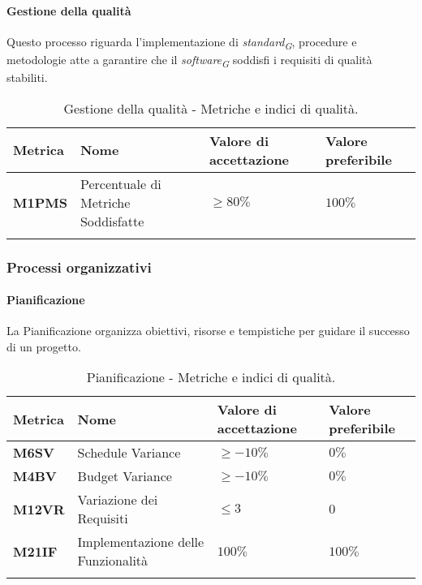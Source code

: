 \paragraph{Gestione della qualità}
Questo processo riguarda l'implementazione di \textit{standard}\textsubscript{\textit{G}}, procedure e metodologie atte a garantire che il \textit{software}\textsubscript{\textit{G}} soddisfi i requisiti di qualità stabiliti.
\hspace{1pt}
    \begin{longtable}{|C{1.5cm}|L{3cm}|L{2.5cm}|L{2.5cm}|}
        \hline
        \textbf{Metrica} & \textbf{Nome} & \textbf{Valore di accettazione} & \textbf{Valore preferibile} \\
        \hline
        \textbf{M1PMS} & Percentuale di Metriche Soddisfatte & $\geq 80\%$ & $100\%$ \\
        \hline
    \caption{Gestione della qualità - Metriche e indici di qualità.}
    \label{tab:gestione_metriche_testo}
\end{longtable}



\subsubsection{Processi organizzativi}

\paragraph{Pianificazione}
La Pianificazione organizza obiettivi, risorse e tempistiche per guidare il successo di un progetto.

\hspace{1pt}
    \begin{longtable}{|C{1.5cm}|L{3cm}|L{2.5cm}|L{2.5cm}|}
        \hline
        \textbf{Metrica} & \textbf{Nome} & \textbf{Valore di accettazione} & \textbf{Valore preferibile} \\
        \hline
        \textbf{M6SV} & Schedule Variance & $\geq -10\%$ & $0\%$ \\
        \hline
        \textbf{M4BV} & Budget Variance & $\geq -10\%$ & $0\%$ \\
        \hline
        \textbf{M12VR} & Variazione dei Requisiti & $\leq 3$ & $0$ \\
        \hline
        \textbf{M21IF} & Implementazione delle Funzionalità & $ 100\%$ & $ 100\%$ \\
        \hline
    \caption{Pianificazione - Metriche e indici di qualità.}
    \label{tab:metriche_pianificazione}
\end{longtable}

